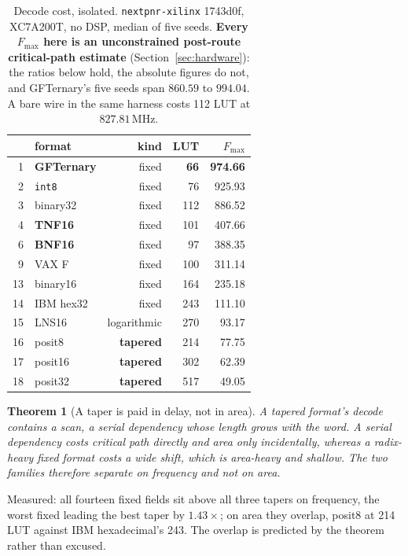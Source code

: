 \documentclass[11pt]{article}
\newtheorem{theorem}{Theorem}
\theoremstyle{definition}
\begin{document}
\begin{table}[t]\centering
\caption{Decode cost, isolated. \texttt{nextpnr-xilinx} 1743d0f, XC7A200T, no
DSP, median of five seeds. \textbf{Every $F_{\max}$ here is an unconstrained
post-route critical-path estimate} (Section~\ref{sec:hardware}): the ratios
below hold, the absolute figures do not, and GFTernary's five seeds span
$860.59$ to $994.04$. A bare wire in the same harness costs 112 LUT at
$827.81$\,MHz.}
\label{tab:cleandecode}
\small
\begin{tabular}{rlrrr}
\toprule
& format & kind & LUT & $F_{\max}$ \\
\midrule
1 & \textbf{GFTernary} & fixed & \textbf{66} & \textbf{974.66} \\
2 & \texttt{int8} & fixed & 76 & 925.93 \\
3 & binary32 & fixed & 112 & 886.52 \\
4 & \textbf{TNF16} & fixed & 101 & 407.66 \\
6 & \textbf{BNF16} & fixed & 97 & 388.35 \\
9 & VAX F & fixed & 100 & 311.14 \\
13 & binary16 & fixed & 164 & 235.18 \\
14 & IBM hex32 & fixed & 243 & 111.10 \\
15 & LNS16 & logarithmic & 270 & 93.17 \\
16 & posit8 & \textbf{tapered} & 214 & 77.75 \\
17 & posit16 & \textbf{tapered} & 302 & 62.39 \\
18 & posit32 & \textbf{tapered} & 517 & 49.05 \\
\bottomrule
\end{tabular}
\end{table}

\begin{theorem}[A taper is paid in delay, not in area]
\label{thm:taperdelay}
A tapered format's decode contains a scan, a serial dependency whose length grows
with the word. A serial dependency costs critical path directly and area only
incidentally, whereas a radix-heavy fixed format costs a wide shift, which is
area-heavy and shallow. The two families therefore separate on frequency and not
on area.
\end{theorem}

Measured: all fourteen fixed fields sit above all three tapers on frequency, the
worst fixed leading the best taper by $1.43\times$; on area they overlap, posit8
at 214 LUT against IBM hexadecimal's 243. The overlap is predicted by the theorem
rather than excused.
\end{document}
